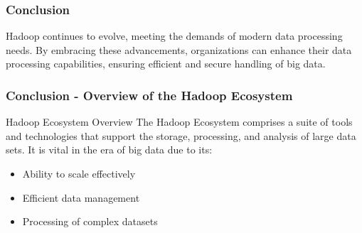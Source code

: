\documentclass[aspectratio=169]{beamer}
\begin{document}
\begin{frame}[fragile]
    \frametitle{Conclusion}
    Hadoop continues to evolve, meeting the demands of modern data processing needs. By embracing these advancements, organizations can enhance their data processing capabilities, ensuring efficient and secure handling of big data.
\end{frame}

\begin{frame}[fragile]
    \frametitle{Conclusion - Overview of the Hadoop Ecosystem}
    \begin{block}{Hadoop Ecosystem Overview}
        The Hadoop Ecosystem comprises a suite of tools and technologies that support the storage, processing, and analysis of large data sets. 
        It is vital in the era of big data due to its:
        \begin{itemize}
            \item Ability to scale effectively
            \item Efficient data management
            \item Processing of complex datasets
        \end{itemize}
    \end{block}
\end{frame}
\end{document}
